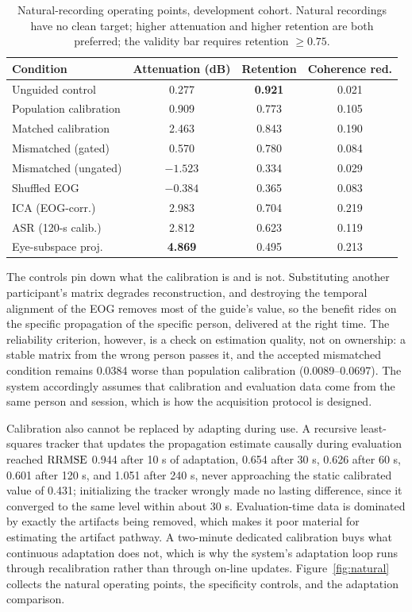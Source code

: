 \begin{table}[t]
\caption{Natural-recording operating points, development cohort. Natural recordings have no clean target; higher attenuation and higher retention are both preferred; the validity bar requires retention $\geq 0.75$.}
\label{tab:natural}
\centering
\small
\begin{tabular}{@{}lccc@{}}
\toprule
Condition & Attenuation (dB) & Retention & Coherence red. \\
\midrule
Unguided control & 0.277 & \textbf{0.921} & 0.021 \\
Population calibration & 0.909 & 0.773 & 0.105 \\
Matched calibration & 2.463 & 0.843 & 0.190 \\
Mismatched (gated) & 0.570 & 0.780 & 0.084 \\
Mismatched (ungated) & $-1.523$ & 0.334 & 0.029 \\
Shuffled EOG & $-0.384$ & 0.365 & 0.083 \\
\midrule
ICA (EOG-corr.) & 2.983 & 0.704 & 0.219 \\
ASR (120-s calib.) & 2.812 & 0.623 & 0.119 \\
Eye-subspace proj. & \textbf{4.869} & 0.495 & 0.213 \\
\bottomrule
\end{tabular}
\end{table}

The controls pin down what the calibration is and is not. Substituting another participant's matrix degrades reconstruction, and destroying the temporal alignment of the EOG removes most of the guide's value, so the benefit rides on the specific propagation of the specific person, delivered at the right time. The reliability criterion, however, is a check on estimation quality, not on ownership: a stable matrix from the wrong person passes it, and the accepted mismatched condition remains 0.0384 worse than population calibration (0.0089--0.0697). The system accordingly assumes that calibration and evaluation data come from the same person and session, which is how the acquisition protocol is designed.

Calibration also cannot be replaced by adapting during use. A recursive least-squares tracker that updates the propagation estimate causally during evaluation reached $\mathrm{RRMSE}$ 0.944 after 10 s of adaptation, 0.654 after 30 s, 0.626 after 60 s, 0.601 after 120 s, and 1.051 after 240 s, never approaching the static calibrated value of 0.431; initializing the tracker wrongly made no lasting difference, since it converged to the same level within about 30 s. Evaluation-time data is dominated by exactly the artifacts being removed, which makes it poor material for estimating the artifact pathway. A two-minute dedicated calibration buys what continuous adaptation does not, which is why the system's adaptation loop runs through recalibration rather than through on-line updates. Figure~\ref{fig:natural} collects the natural operating points, the specificity controls, and the adaptation comparison.

